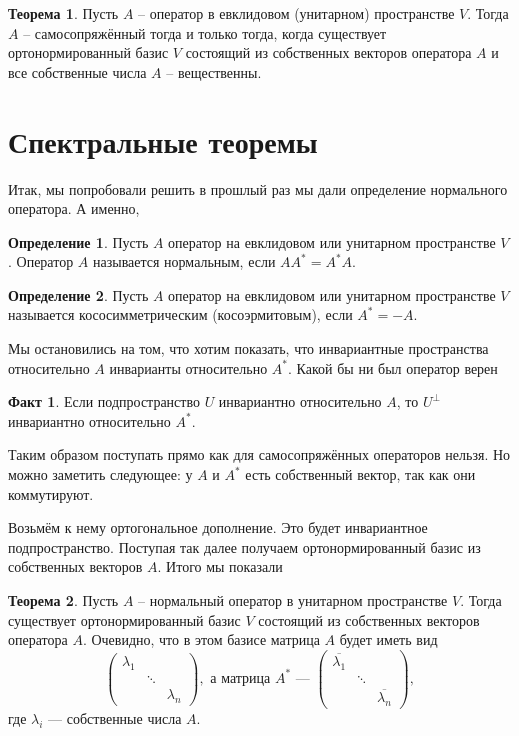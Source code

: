 \documentclass[10pt,a4paper,oneside]{book}
\theoremstyle{definition}
\newtheorem{defn}{Определение}
\newtheorem*{fact}{Факт}
\newtheorem{thm}{Теорема}
\newcommand{\ovl}{\overline}
\def\thrm{\begin{thm}}
\def\ethrm{\end{thm}}
\def\dfn{\begin{defn}}
\def\edfn{\end{defn}}
\def\fct{\begin{fact}}
\def\efct{\end{fact}}
\begin{document}
\thrm Пусть $A$ -- оператор в евклидовом (унитарном) пространстве $V$. Тогда $A$ -- самосопряжённый тогда и только тогда, когда существует ортонормированный базис $V$ состоящий из собственных векторов оператора $A$ и все собственные числа $A$ -- вещественны.
\ethrm







\section{Спектральные теоремы}

Итак, мы попробовали решить в прошлый раз мы дали определение нормального оператора.
А именно, 
\dfn Пусть $A$ оператор на евклидовом или унитарном пространстве $V$. Оператор $A$ называется нормальным, если $AA^*=A^*A$.
\edfn

\dfn Пусть $A$ оператор на евклидовом или унитарном пространстве $V$ называется кососимметрическим (косоэрмитовым), если $A^*=-A$.
\edfn

Мы остановились на том, что хотим показать, что инвариантные пространства относительно $A$ инварианты относительно $A^*$. Какой бы ни был оператор верен

\fct Если подпространство $U$ инвариантно относительно $A$, то $U^{\bot}$ инвариантно относительно $A^{*}$.
\efct

Таким образом поступать прямо как для самосопряжённых операторов нельзя. Но можно заметить следующее: у $A$ и $A^*$ есть собственный вектор, так как они коммутируют.

Возьмём к нему ортогональное дополнение. Это будет инвариантное подпространство. Поступая так далее получаем ортонормированный базис из собственных векторов $A$. Итого мы показали
\thrm Пусть $A$ -- нормальный оператор в унитарном пространстве $V$. Тогда существует ортонормированный базис $V$ состоящий из собственных векторов оператора $A$. Очевидно, что в этом базисе матрица $A$ будет иметь вид 
$$ \begin{pmatrix}
\lambda_1 &&\\
&\ddots&\\
&&\lambda_n
 \end{pmatrix}, \text{ а матрица $A^*$ --- }  \begin{pmatrix}
\ovl{\lambda_1} &&\\
&\ddots&\\
&&\ovl{\lambda_n}
 \end{pmatrix}, $$
где $\lambda_i$ --- собственные числа $A$.
\ethrm
\end{document}
